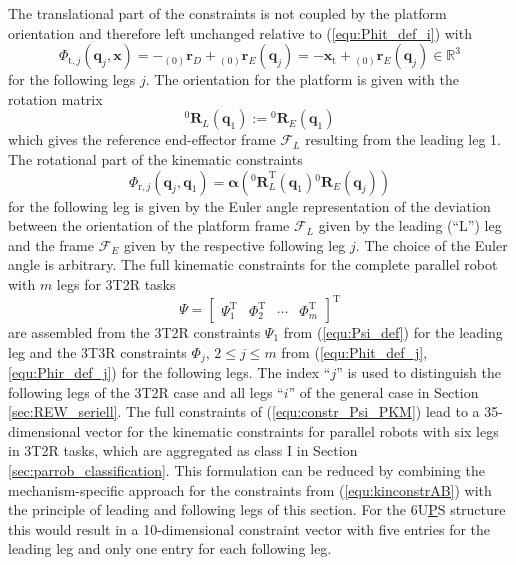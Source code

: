 \documentclass[robotics,article,accept,moreauthors,pdftex]{Definitions/mdpi}
\newcommand{\bm}[1]{\boldsymbol{#1}}
\newcommand{\ortvek}[4]{{ }_{(#1)}{\boldsymbol{#2}}^{#3}_{#4} }
\newcommand{\rotmat}[2]{{{ }^{#1}\boldsymbol{R}}_{#2}}
\newcommand{\transp}[0]{{\mathrm{T}}}
\newcommand{\ks}[1]{{\mathcal{F}}_{#1}}
\let\Phi\varPhi
\let\Psi\varPsi
\begin{document}
The translational part of the constraints is not coupled by the platform orientation and therefore left unchanged relative to (\ref{equ:Phit_def_i}) with
%
\begin{equation}
\bm{\Phi}_{\mathrm{t},j}(\bm{q}_j,\bm{x})
= 
- \ortvek{0}{r}{}{D} + \ortvek{0}{r}{}{E}(\bm{q}_j)
=
- \bm{x}_{\mathrm{t}} + \ortvek{0}{r}{}{E}(\bm{q}_j) \in {\mathbb{R}}^{3}
\label{equ:Phit_def_j}
\end{equation}
%
for the following legs $j$.
% 
The orientation for the platform is given with the rotation matrix
%
\begin{equation}
\rotmat{0}{L}(\bm{q}_1)
:= 
\rotmat{0}{E}(\bm{q}_1)
\end{equation}
%
which gives the reference end-effector frame $\ks{L}$ resulting from the leading leg 1.
The rotational part of the kinematic constraints
%
\begin{equation}
\bm{\Phi}_{\mathrm{r},j}(\bm{q}_j,\bm{q}_1)
=
\bm{\alpha}(\rotmat{0}{L}^\mathrm{T}(\bm{q}_1)\rotmat{0}{E}(\bm{q}_j))
\label{equ:Phir_def_j}
\end{equation}
%
for the following leg is given by the Euler angle representation of the deviation between the orientation of the platform frame $\ks{L}$ given by the leading (``L'') leg and the frame $\ks{E}$ given by the respective following leg $j$.
The choice of the Euler angle  is arbitrary.
The full kinematic constraints for the complete parallel robot with $m$ legs for 3T2R tasks
%
\begin{equation}
\bm{\Psi}
=
\begin{bmatrix}
\bm{\Psi}_1^\transp &
\bm{\Phi}_2^\transp &
\cdots &
\bm{\Phi}_m^\transp
\end{bmatrix}^\transp
\label{equ:constr_Psi_PKM}
\end{equation}
%
are assembled from the 3T2R constraints $\bm{\Psi}_1$ from (\ref{equ:Psi_def}) for the leading leg and the 3T3R constraints $\bm{\Phi}_j$, $2\le{}j\le{}m$ from (\ref{equ:Phit_def_j},\ref{equ:Phir_def_j}) for the following legs.
The index ``$j$'' is used to distinguish the following legs of the 3T2R case and all legs ``$i$'' of the general case in Section\,\ref{sec:REW_seriell}.
%
The full constraints of (\ref{equ:constr_Psi_PKM}) lead to a 35-dimensional vector for the kinematic constraints for parallel robots with six legs in 3T2R tasks, which are aggregated as class I in Section\,\ref{sec:parrob_classification}.
This formulation can be reduced by combining the mechanism-specific approach for the constraints from (\ref{equ:kinconstrAB}) with the principle of leading and following legs of this section.
For the 6U\underline{P}S structure this would result in a 10-dimensional constraint vector with five entries for the leading leg and only one entry for each following leg.
\end{document}
